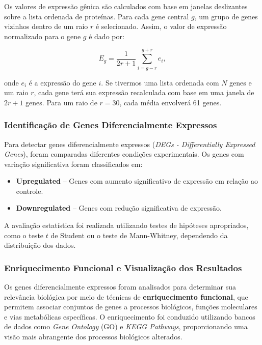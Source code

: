 \documentclass[12pt]{article}
\begin{document}
Os valores de expressão gênica são calculados com base em janelas deslizantes sobre a lista ordenada de proteínas. Para cada gene central $g$, um grupo de genes vizinhos dentro de um raio $r$ é selecionado. Assim, o valor de expressão normalizado para o gene $g$ é dado por:

\begin{equation}
    E_g = \frac{1}{2r+1} \sum_{i=g-r}^{g+r} e_i,
\end{equation}

onde $e_i$ é a expressão do gene $i$. Se tivermos uma lista ordenada com $N$ genes e um raio $r$, cada gene terá sua expressão recalculada com base em uma janela de $2r+1$ genes. Para um raio de $r = 30$, cada média envolverá 61 genes.

\subsubsection{Identificação de Genes Diferencialmente Expressos}

Para detectar genes diferencialmente expressos (\textit{DEGs - Differentially Expressed Genes}), foram comparadas diferentes condições experimentais. Os genes com variação significativa foram classificados em:
\begin{itemize}
    \item \textbf{Upregulated} – Genes com aumento significativo de expressão em relação ao controle.
    \item \textbf{Downregulated} – Genes com redução significativa de expressão.
\end{itemize}

A avaliação estatística foi realizada utilizando testes de hipóteses apropriados, como o teste $t$ de Student ou o teste de Mann-Whitney, dependendo da distribuição dos dados.

\subsubsection{Enriquecimento Funcional e Visualização dos Resultados}

Os genes diferencialmente expressos foram analisados para determinar sua relevância biológica por meio de técnicas de \textbf{enriquecimento funcional}, que permitem associar conjuntos de genes a processos biológicos, funções moleculares e vias metabólicas específicas. O enriquecimento foi conduzido utilizando bancos de dados como \textit{Gene Ontology} (GO) e \textit{KEGG Pathways}, proporcionando uma visão mais abrangente dos processos biológicos alterados.
\end{document}
